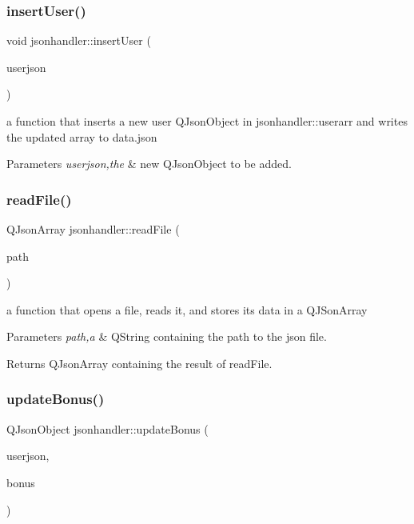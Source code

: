 \subsubsection{\texorpdfstring{insert\+User()}{insertUser()}}
{\footnotesize\ttfamily void jsonhandler\+::insert\+User (\begin{DoxyParamCaption}\item[{Q\+Json\+Object}]{userjson }\end{DoxyParamCaption})}



a function that inserts a new user Q\+Json\+Object in jsonhandler\+::userarr and writes the updated array to data.\+json 


\begin{DoxyParams}{Parameters}
{\em userjson,the} & new Q\+Json\+Object to be added. \\
\hline
\end{DoxyParams}
\mbox{\label{classjsonhandler_aebc2c7497f32984133a9352d03fd06e7}} 
\subsubsection{\texorpdfstring{read\+File()}{readFile()}}
{\footnotesize\ttfamily Q\+Json\+Array jsonhandler\+::read\+File (\begin{DoxyParamCaption}\item[{Q\+String}]{path }\end{DoxyParamCaption})}



a function that opens a file, reads it, and stores its data in a Q\+J\+Son\+Array 


\begin{DoxyParams}{Parameters}
{\em path,a} & Q\+String containing the path to the json file. \\
\hline
\end{DoxyParams}
\begin{DoxyReturn}{Returns}
Q\+Json\+Array containing the result of read\+File. 
\end{DoxyReturn}
\mbox{\label{classjsonhandler_a9bb2dc65754d170a493d60e82cc5ff18}} 
\subsubsection{\texorpdfstring{update\+Bonus()}{updateBonus()}}
{\footnotesize\ttfamily Q\+Json\+Object jsonhandler\+::update\+Bonus (\begin{DoxyParamCaption}\item[{Q\+Json\+Object}]{userjson,  }\item[{int}]{bonus }\end{DoxyParamCaption})}



